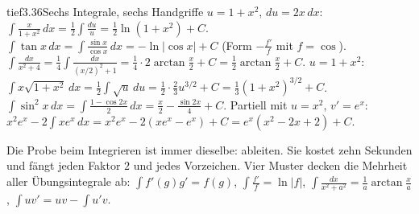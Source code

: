 \begin{loesungkarte}{tief}{3.36}{Sechs Integrale, sechs Handgriffe}
$u = 1 + x^{2}$, $du = 2x\,dx$: $\int\frac x{1 + x^{2}}\,dx = \frac12\int\frac{du}u = \frac12\ln(1 + x^{2}) + C$.
$\int\tan x\,dx = \int\frac{\sin x}{\cos x}\,dx = -\ln|\cos x| + C$ (Form $-\frac{f'}f$ mit $f = \cos$).
$\int\frac{dx}{x^{2} + 4} = \frac14\int\frac{dx}{(x/2)^{2} + 1} = \frac14\cdot2\arctan\frac x2 + C = \frac12\arctan\frac x2 + C$.
$u = 1 + x^{2}$: $\int x\sqrt{1 + x^{2}}\,dx = \frac12\int\sqrt u\,du = \frac12\cdot\frac23u^{3/2} + C = \frac13(1 + x^{2})^{3/2} + C$.
$\int\sin^{2}x\,dx = \int\frac{1 - \cos2x}2\,dx = \frac x2 - \frac{\sin2x}4 + C$.
Partiell mit $u = x^{2}$, $v' = e^{x}$: $x^{2}e^{x} - 2\int xe^{x}\,dx = x^{2}e^{x} - 2(xe^{x} - e^{x}) + C = e^{x}(x^{2} - 2x + 2) + C$.
\begin{mitnehmen}\kastentext
Die Probe beim Integrieren ist immer dieselbe: ableiten. Sie kostet zehn Sekunden und fängt jeden Faktor $2$ und jedes Vorzeichen. Vier Muster decken die Mehrheit aller Übungsintegrale ab: $\int f'(g)g' = f(g)$, $\int\frac{f'}f = \ln|f|$, $\int\frac{dx}{x^{2} + a^{2}} = \frac1a\arctan\frac xa$, $\int uv' = uv - \int u'v$.
\end{mitnehmen}
\end{loesungkarte}

